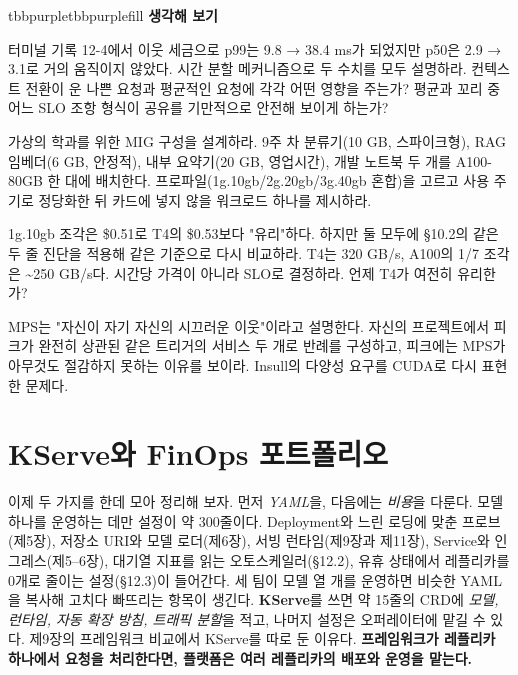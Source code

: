 \begin{calloutbox}{tbbpurple}{tbbpurplefill}
{\normalsize\bfseries\color{tbbpurple}생각해 보기}\par\vspace{3pt}
\begin{tbbitemize}
  \item 터미널 기록 12-4에서 이웃 세금으로 p99는 9.8 → 38.4 ms가 되었지만 p50은 2.9 → 3.1로 거의 움직이지 않았다. 시간 분할 메커니즘으로 두 수치를 모두 설명하라. 컨텍스트 전환이 운 나쁜 요청과 평균적인 요청에 각각 어떤 영향을 주는가? 평균과 꼬리 중 어느 SLO 조항 형식이 공유를 기만적으로 안전해 보이게 하는가?
  \item 가상의 학과를 위한 MIG 구성을 설계하라. 9주 차 분류기(10 GB, 스파이크형), RAG 임베더(6 GB, 안정적), 내부 요약기(20 GB, 영업시간), 개발 노트북 두 개를 A100-80GB 한 대에 배치한다. 프로파일(1g.10gb/2g.20gb/3g.40gb 혼합)을 고르고 사용 주기로 정당화한 뒤 카드에 넣지 않을 워크로드 하나를 제시하라.
  \item 1g.10gb 조각은 \$0.51로 T4의 \$0.53보다 "유리"하다. 하지만 둘 모두에 §10.2의 같은 두 줄 진단을 적용해 같은 기준으로 다시 비교하라. T4는 320 GB/s, A100의 1/7 조각은 \textasciitilde{}250 GB/s다. 시간당 가격이 아니라 SLO로 결정하라. 언제 T4가 여전히 유리한가?
  \item MPS는 "자신이 자기 자신의 시끄러운 이웃"이라고 설명한다. 자신의 프로젝트에서 피크가 완전히 상관된 같은 트리거의 서비스 두 개로 반례를 구성하고, 피크에는 MPS가 아무것도 절감하지 못하는 이유를 보이라. Insull의 다양성 요구를 CUDA로 다시 표현한 문제다.
\end{tbbitemize}
\end{calloutbox}

\section{KServe와 FinOps 포트폴리오}

이제 두 가지를 한데 모아 정리해 보자. 먼저 \textit{YAML}을, 다음에는 \textit{비용}을 다룬다. 모델 하나를 운영하는 데만 설정이 약 300줄이다. Deployment와 느린 로딩에 맞춘 프로브(제5장), 저장소 URI와 모델 로더(제6장), 서빙 런타임(제9장과 제11장), Service와 인그레스(제5–6장), 대기열 지표를 읽는 오토스케일러(§12.2), 유휴 상태에서 레플리카를 0개로 줄이는 설정(§12.3)이 들어간다. 세 팀이 모델 열 개를 운영하면 비슷한 YAML을 복사해 고치다 빠뜨리는 항목이 생긴다. \textbf{KServe}를 쓰면 약 15줄의  CRD에 \textit{모델, 런타임, 자동 확장 방침, 트래픽 분할}을 적고, 나머지 설정은 오퍼레이터에 맡길 수 있다. 제9장의 프레임워크 비교에서 KServe를 따로 둔 이유다. \textbf{프레임워크가 레플리카 하나에서 요청을 처리한다면, 플랫폼은 여러 레플리카의 배포와 운영을 맡는다.}

